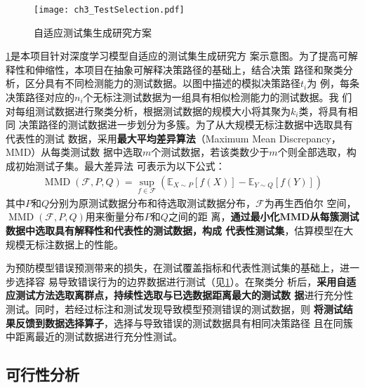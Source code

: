 \begin{figure}[htp]
    \begin{small}
        \begin{center}
            \texttt{[image: ch3\_TestSelection.pdf]}
        \end{center}
        \caption{自适应测试集生成研究方案}
        \label{fig:ch3:interpretability}
    \end{small}
\end{figure}

\cref{fig:ch3:interpretability}是本项目针对深度学习模型自适应的测试集生成研究方
案示意图。为了提高可解释性和伸缩性，本项目在抽象可解释决策路径的基础上，结合决策
路径和聚类分析，区分具有不同检测能力的测试数据。以图中描述的模拟决策路径$t_i$为
例，每条决策路径对应的$n_i$个无标注测试数据为一组具有相似检测能力的测试数据。我
们对每组测试数据进行聚类分析，根据测试数据的规模大小将其聚为$k_i$类，将具有相同
决策路径的测试数据进一步划分为多簇。为了从大规模无标注数据中选取具有代表性的测试
数据，采用\textbf{最大平均差异算法}（Maximum Mean Discrepancy，MMD）从每类测试数
据中选取$m$个测试数据，若该类数少于$m$个则全部选取，构成初始测试子集。最大差异法
可表示为以下公式：
\begin{equation}
    \begin{aligned}
        \operatorname{MMD}(\mathcal{F}, P, Q)=\sup _{f \in \mathcal{F}}\left(\mathbb{E}_{X \sim P}[f(X)]-\mathbb{E}_{Y \sim Q}[f(Y)]\right)
    \end{aligned}
\end{equation}
其中$P$和$Q$分别为原测试数据分布和待选取测试数据分布，$\mathcal{F}$为再生西伯尔
空间，$\operatorname{MMD}(\mathcal{F}, P, Q)$用来衡量分布$P$和$Q$之间的距
离，\textbf{通过最小化MMD从每簇测试数据中选取具有解释性和代表性的测试数据，构成
代表性测试集}，估算模型在大规模无标注数据上的性能。

为预防模型错误预测带来的损失，在测试覆盖指标和代表性测试集的基础上，进一步选择容
易导致错误行为的边界数据进行测试（见\cref{fig:ch3:interpretability}）。在聚类分
析后，\textbf{采用自适应测试方法选取离群点，持续性选取与已选数据距离最大的测试数
据}进行充分性测试。同时，若经过标注和测试发现导致模型预测错误的测试数据，则
\textbf{将测试结果反馈到数据选择算子}，选择与导致错误的测试数据具有相同决策路径
且在同簇中距离最近的测试数据进行充分性测试。

\subsection{可行性分析}

